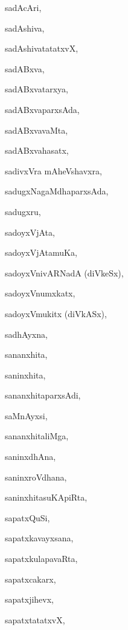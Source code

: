 \begin{multicols}{2}
{sadAcAri}, \pageref{sadAcAri}

{sadAshiva}, \pageref{sadAshiva}

{sadAshivatatatxvX}, \pageref{sadAshivatatatxvX}

{sadABxva}, \pageref{sadABxva}

{sadABxvatarxya}, \pageref{sadABxvatarxya}

{sadABxvaparxsAda}, \pageref{sadABxvaparxsAda}

{sadABxvavaMta}, \pageref{sadABxvavaMta}

{sadABxvahasatx}, \pageref{sadABxvahasatx}

{sadivxVra mAheVshavxra}, \pageref{sadivxVramAheVshavxra}

{sadugxNagaMdhaparxsAda}, \pageref{sadugxNagaMdhaparxsAda}

{sadugxru}, \pageref{sadugxru}

{sadoyxVjAta}, \pageref{sadoyxVjAta}

{sadoyxVjAtamuKa}, \pageref{sadoyxVjAtamuKa}

{sadoyxVnivARNadA (diVkeSx)}, \pageref{sadoyxVnivARNadAdiVkeSx}

{sadoyxVnumxkatx}, \pageref{sadoyxVnumxkatx}

{sadoyxVmukitx (diVkASx)}, \pageref{sadoyxVmukitxdiVkASx}

{sadhAyxna}, \pageref{sadhAyxna}

{sananxhita}, \pageref{sananxhita}

{saninxhita}, \pageref{saninxhita}

{sananxhitaparxsAdi}, \pageref{sananxhitaparxsAdi}

{saMnAyxsi}, \pageref{saMnAyxsi}

{sananxhitaliMga}, \pageref{sananxhitaliMga}

{saninxdhAna}, \pageref{saninxdhAna}

{saninxroVdhana}, \pageref{saninxroVdhana}

{saninxhitasuKApiRta}, \pageref{saninxhitasuKApiRta}

{sapatxQuSi}, \pageref{sapatxQuSi}

{sapatxkavayxsana}, \pageref{sapatxkavayxsana}

{sapatxkulapavaRta}, \pageref{sapatxkulapavaRta}

{sapatxcakarx}, \pageref{sapatxcakarx}

{sapatxjihevx}, \pageref{sapatxjihevx}

{sapatxtatatxvX}, \pageref{sapatxtatatxvX}


\end{multicols}
